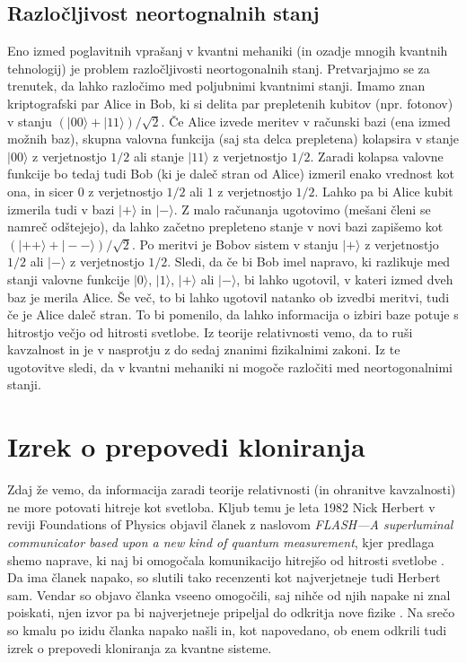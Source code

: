 \documentclass[12pt]{article}
\providecommand{\DIFaddend}{} %
\DeclareRobustCommand{\DIFaddend}{\DIFOaddend \let\includegraphics\DIFOincludegraphics} %
\begin{document}
\DIFaddend \subsection{Razločljivost neortognalnih stanj}

Eno izmed poglavitnih vprašanj v kvantni mehaniki (in ozadje mnogih kvantnih tehnologij) je problem razločljivosti neortogonalnih stanj. Pretvarjajmo se za trenutek, da lahko razločimo med poljubnimi kvantnimi stanji. Imamo znan kriptografski par Alice in Bob, ki si delita par prepletenih kubitov (npr. fotonov) v stanju $ ( | 00 \rangle + | 11 \rangle ) / \sqrt{2}$. Če Alice izvede meritev v računski bazi (ena izmed možnih baz), skupna valovna funkcija (saj sta delca prepletena) kolapsira v stanje $| 00 \rangle$ z verjetnostjo $1/2$ ali stanje $| 11 \rangle$ z verjetnostjo $1/2$. Zaradi kolapsa valovne funkcije bo tedaj tudi Bob (ki je daleč stran od Alice) izmeril enako vrednost kot ona, in sicer $ 0 $ z verjetnostjo $1/2$ ali $ 1 $ z verjetnostjo $1/2$. Lahko pa bi Alice kubit izmerila tudi v bazi $| + \rangle$ in $| - \rangle$. Z malo računanja ugotovimo (mešani členi se namreč odštejejo), da lahko začetno prepleteno stanje v novi bazi zapišemo kot $ ( | ++ \rangle + | -- \rangle ) / \sqrt{2} $. Po meritvi je Bobov sistem   v stanju $| + \rangle $ z verjetnostjo $1/2$ ali $| - \rangle $ z verjetnostjo $1/2$. Sledi, da če bi Bob imel napravo, ki razlikuje med stanji valovne funkcije  $| 0 \rangle$, $| 1 \rangle$, $|+ \rangle$ ali $| - \rangle$, bi lahko ugotovil, v kateri izmed dveh baz je merila Alice. Še več, to bi lahko ugotovil natanko ob izvedbi meritvi, tudi če je Alice daleč stran. To bi pomenilo, da lahko informacija o izbiri baze potuje s hitrostjo večjo od hitrosti svetlobe. Iz teorije relativnosti vemo, da to ruši kavzalnost in je v nasprotju z do sedaj znanimi fizikalnimi zakoni. Iz te ugotovitve sledi, da v kvantni mehaniki ni mogoče razločiti med neortogonalnimi stanji. \cite{nielsenQuantumComputationQuantum2012}  

 \section{Izrek o prepovedi kloniranja}
   Zdaj že vemo, da informacija zaradi teorije relativnosti (in ohranitve kavzalnosti) ne more potovati hitreje kot svetloba. Kljub temu je leta 1982 Nick Herbert v reviji Foundations of Physics objavil članek z naslovom \emph{FLASH—A superluminal communicator based upon a new kind of quantum measurement}, kjer predlaga shemo naprave, ki naj bi omogočala komunikacijo hitrejšo od hitrosti svetlobe \cite{herbertFLASHSuperluminalCommunicator1982}. Da ima članek napako, so slutili tako recenzenti kot najverjetneje tudi Herbert sam. Vendar so objavo članka vseeno omogočili, saj nihče od njih napake ni znal poiskati, njen izvor pa bi najverjetneje pripeljal do odkritja nove fizike \cite{peresHowNocloningTheorem2003}. Na srečo so kmalu po izidu članka napako našli \cite{woottersSingleQuantumCannot1982} in, kot napovedano, ob enem odkrili tudi izrek o prepovedi kloniranja za kvantne sisteme.
\end{document}
